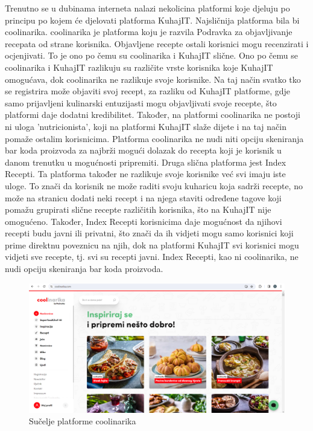 		Trenutno se u dubinama interneta nalazi nekolicina platformi koje djeluju po principu po kojem će djelovati platforma KuhajIT. Najsličnija platforma bila bi coolinarika. coolinarika je platforma koju je razvila Podravka za objavljivanje recepata od strane korisnika. Objavljene recepte ostali korisnici mogu recenzirati i ocjenjivati. To je ono po čemu su coolinarika i KuhajIT slične. Ono po čemu se coolinarika i KuhajIT razlikuju su različite vrste korisnika koje KuhajIT omogućava, dok coolinarika ne razlikuje svoje korisnike. Na taj način svatko tko se registrira može objaviti svoj recept, za razliku od KuhajIT platforme, gdje samo prijavljeni kulinarski entuzijasti mogu objavljivati svoje recepte, što platformi daje dodatni kredibilitet. Također, na platformi coolinarika ne postoji ni uloga 'nutricionista', koji na platformi KuhajIT slaže dijete i na taj način pomaže ostalim korisnicima. Platforma coolinarika ne nudi niti opciju skeniranja bar koda proizvoda za najbrži mogući dolazak do recepta koji je korisnik u danom trenutku u mogućnosti pripremiti.
		Druga slična platforma jest Index Recepti. Ta platforma također ne razlikuje svoje korisnike već svi imaju iste uloge. To znači da korisnik ne može raditi svoju kuharicu koja sadrži recepte, no može na stranicu dodati neki recept i na njega staviti određene tagove koji pomažu grupirati slične recepte različitih korisnika, što na KuhajIT nije omogućeno. Također, Index Recepti korisnicima daje mogućnost da njihovi recepti budu javni ili privatni, što znači da ih vidjeti mogu samo korisnici koji prime direktnu poveznicu na njih, dok na platformi KuhajIT svi korisnici mogu vidjeti sve recepte, tj. svi su recepti javni. Index Recepti, kao ni coolinarika, ne nudi opciju skeniranja bar koda proizvoda.
		
				\begin{figure}[H]
			\includegraphics[scale=0.4]{slike/coolinarika.PNG} %
			\centering
			\caption{Sučelje platforme coolinarika}
			\label{coolinarika}
		\end{figure}
	

